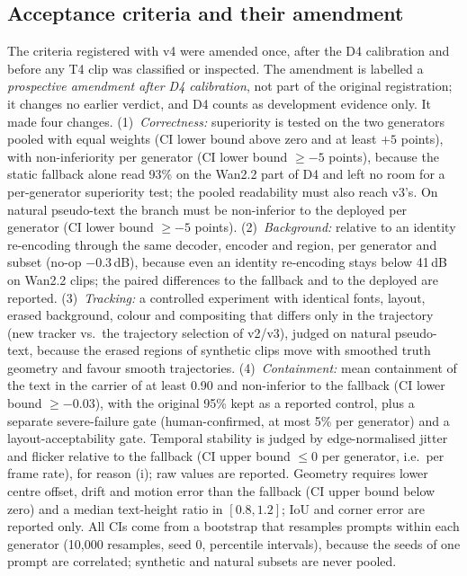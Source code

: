 \subsection{Acceptance criteria and their amendment}
\label{sec:supp_g_criteria}
The criteria registered with v4 were amended once, after the D4 calibration and before any T4 clip was classified or inspected. The amendment is labelled a \emph{prospective amendment after D4 calibration}, not part of the original registration; it changes no earlier verdict, and D4 counts as development evidence only. It made four changes. (1)~\emph{Correctness:} superiority is tested on the two generators pooled with equal weights (CI lower bound above zero and at least $+5$ points), with non-inferiority per generator (CI lower bound $\geq -5$ points), because the static fallback alone read 93\% on the Wan2.2 part of D4 and left no room for a per-generator superiority test; the pooled readability must also reach v3's. On natural pseudo-text the branch must be non-inferior to the deployed \method per generator (CI lower bound $\geq -5$ points). (2)~\emph{Background:} relative to an identity re-encoding through the same decoder, encoder and region, per generator and subset (no-op $-0.3$\,dB), because even an identity re-encoding stays below 41\,dB on Wan2.2 clips; the paired differences to the fallback and to the deployed \method are reported. (3)~\emph{Tracking:} a controlled experiment with identical fonts, layout, erased background, colour and compositing that differs only in the trajectory (new tracker vs.\ the trajectory selection of v2/v3), judged on natural pseudo-text, because the erased regions of synthetic clips move with smoothed truth geometry and favour smooth trajectories. (4)~\emph{Containment:} mean containment of the text in the carrier of at least 0.90 and non-inferior to the fallback (CI lower bound $\geq -0.03$), with the original 95\% kept as a reported control, plus a separate severe-failure gate (human-confirmed, at most 5\% per generator) and a layout-acceptability gate. Temporal stability is judged by edge-normalised jitter and flicker relative to the fallback (CI upper bound $\leq 0$ per generator, i.e.\ per frame rate), for reason (i); raw values are reported. Geometry requires lower centre offset, drift and motion error than the fallback (CI upper bound below zero) and a median text-height ratio in $[0.8, 1.2]$; IoU and corner error are reported only. All CIs come from a bootstrap that resamples prompts within each generator (10{,}000 resamples, seed 0, percentile intervals), because the seeds of one prompt are correlated; synthetic and natural subsets are never pooled.

